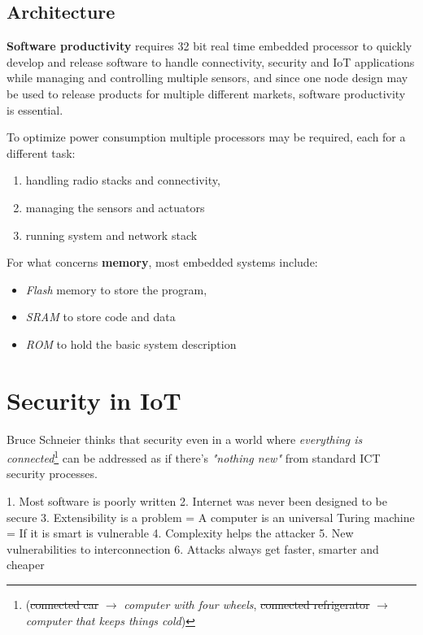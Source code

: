 \subsection{Architecture}
\textbf{Software productivity} requires 32 bit real time embedded processor to quickly
develop and release software to handle connectivity, security and IoT
applications while managing and controlling multiple sensors,
and since one node design may be used to
release products for multiple different markets,
software productivity is essential.

To optimize power consumption multiple processors may be required, each for a different task:
\begin{enumerate}
   \item handling radio stacks and connectivity, 
   \item managing the sensors and actuators
   \item running system and network stack
\end{enumerate}
    
For what concerns \textbf{memory},
most embedded systems include:
\begin{itemize}
   \item \textit{Flash} memory to store the program,
   \item \textit{SRAM} to store code and data
   \item \textit{ROM} to hold the basic system description
\end{itemize}

\section{Security in IoT}
Bruce Schneier thinks that
security even in a world where \textit{everything is connected}\footnote{(\st{connected car} $\longrightarrow$ \textit{computer with four wheels}, \st{connected refrigerator} $\longrightarrow$ \textit{computer that keeps things cold})} can be addressed as if there's \textit{"nothing new"} from standard ICT security processes.

1. Most software is poorly written
2. Internet was never been designed to be secure
3. Extensibility is a problem = A computer is an universal Turing
machine = If it is smart is vulnerable
4. Complexity helps the attacker
5. New vulnerabilities to interconnection
6. Attacks always get faster, smarter and cheaper


